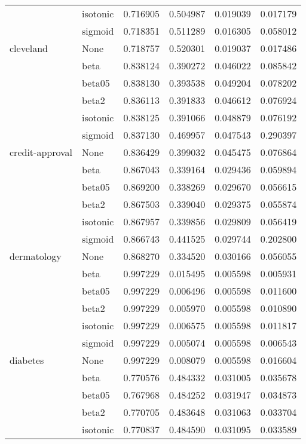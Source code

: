 \begin{tabular}{llrrrr}
        & isotonic &  0.716905 &  0.504987 &  0.019039 &  0.017179 \\
        & sigmoid &  0.718351 &  0.511289 &  0.016305 &  0.058012 \\
cleveland & None &  0.718757 &  0.520301 &  0.019037 &  0.017486 \\
        & beta &  0.838124 &  0.390272 &  0.046022 &  0.085842 \\
        & beta05 &  0.838130 &  0.393538 &  0.049204 &  0.078202 \\
        & beta2 &  0.836113 &  0.391833 &  0.046612 &  0.076924 \\
        & isotonic &  0.838125 &  0.391066 &  0.048879 &  0.076192 \\
        & sigmoid &  0.837130 &  0.469957 &  0.047543 &  0.290397 \\
credit-approval & None &  0.836429 &  0.399032 &  0.045475 &  0.076864 \\
        & beta &  0.867043 &  0.339164 &  0.029436 &  0.059894 \\
        & beta05 &  0.869200 &  0.338269 &  0.029670 &  0.056615 \\
        & beta2 &  0.867503 &  0.339040 &  0.029375 &  0.055874 \\
        & isotonic &  0.867957 &  0.339856 &  0.029809 &  0.056419 \\
        & sigmoid &  0.866743 &  0.441525 &  0.029744 &  0.202800 \\
dermatology & None &  0.868270 &  0.334520 &  0.030166 &  0.056055 \\
        & beta &  0.997229 &  0.015495 &  0.005598 &  0.005931 \\
        & beta05 &  0.997229 &  0.006496 &  0.005598 &  0.011600 \\
        & beta2 &  0.997229 &  0.005970 &  0.005598 &  0.010890 \\
        & isotonic &  0.997229 &  0.006575 &  0.005598 &  0.011817 \\
        & sigmoid &  0.997229 &  0.005074 &  0.005598 &  0.006543 \\
diabetes & None &  0.997229 &  0.008079 &  0.005598 &  0.016604 \\
        & beta &  0.770576 &  0.484332 &  0.031005 &  0.035678 \\
        & beta05 &  0.767968 &  0.484252 &  0.031947 &  0.034873 \\
        & beta2 &  0.770705 &  0.483648 &  0.031063 &  0.033704 \\
        & isotonic &  0.770837 &  0.484590 &  0.031095 &  0.033589 \\

\end{tabular}
